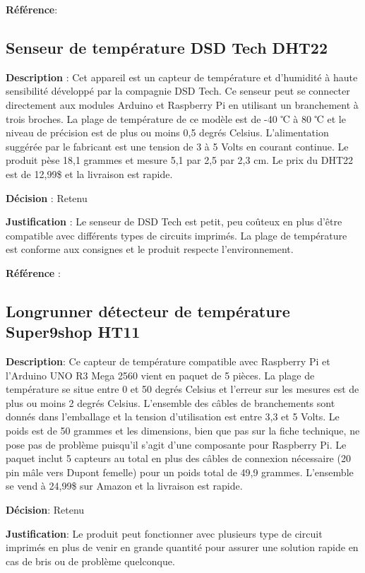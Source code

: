 \textbf{Référence}: \cite{ds18b20}

\subsection{Senseur de température DSD Tech DHT22 }


\textbf{Description} : Cet appareil est un capteur de température et d’humidité à haute sensibilité développé par la compagnie DSD Tech. Ce senseur peut se connecter directement aux modules Arduino et Raspberry Pi en utilisant un branchement à trois broches. La plage de température de ce modèle est de -40 ℃ à 80 ℃ et le niveau de précision est de plus ou moins 0,5 degrés Celsius. L’alimentation suggérée par le fabricant est une tension de 3 à 5 Volts en courant continue. Le produit pèse 18,1 grammes et mesure 5,1 par 2,5 par 2,3 cm. Le prix du DHT22 est de 12,99\$ et la livraison est rapide. 

\textbf{Décision} : Retenu 

\textbf{Justification} : Le senseur de DSD Tech est petit, peu coûteux en plus d’être compatible avec différents types de circuits imprimés. La plage de température est conforme aux consignes et le produit respecte l’environnement.     

\textbf{Référence} : \cite{dht22}


\subsection{Longrunner détecteur de température Super9shop HT11}

\textbf{Description}: Ce capteur de température compatible avec Raspberry Pi et l'Arduino UNO R3 Mega 2560 vient en paquet de 5 pièces. La plage de température se situe entre 0 et 50 degrés Celsius et l’erreur sur les mesures est de plus ou moins 2 degrés Celsius. L’ensemble des câbles de branchements sont donnés dans l’emballage et la tension d'utilisation est entre 3,3 et 5 Volts. Le poids est de 50 grammes et les dimensions, bien que pas sur la fiche technique, ne pose pas de problème puisqu’il s’agit d’une composante pour Raspberry Pi. Le paquet inclut 5 capteurs au total en plus des câbles de connexion nécessaire (20 pin mâle vers Dupont femelle) pour un poids total de 49,9 grammes. L’ensemble se vend à 24,99\$ sur Amazon et la livraison est rapide. 

\textbf{Décision}: Retenu

\textbf{Justification}: Le produit peut fonctionner avec plusieurs type de circuit imprimés en plus de venir en grande quantité pour assurer une solution rapide en cas de bris ou de problème quelconque. 

